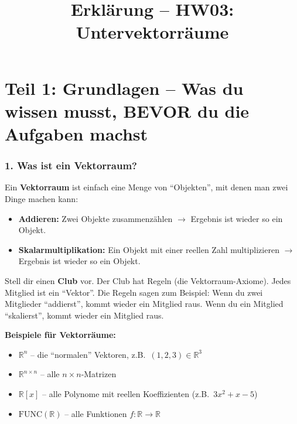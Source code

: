 \documentclass[a4paper,12pt]{article}
\title{Erkl\"arung -- HW03: Untervektorr\"aume}
\author{}
\date{}
\begin{document}
\maketitle

\part*{Teil 1: Grundlagen -- Was du wissen musst, BEVOR du die Aufgaben machst}

\section*{1. Was ist ein Vektorraum?}

Ein \textbf{Vektorraum} ist einfach eine Menge von ``Objekten'', mit denen man zwei Dinge machen kann:
\begin{itemize}
    \item \textbf{Addieren:} Zwei Objekte zusammenz\"ahlen $\rightarrow$ Ergebnis ist wieder so ein Objekt.
    \item \textbf{Skalarmultiplikation:} Ein Objekt mit einer reellen Zahl multiplizieren $\rightarrow$ Ergebnis ist wieder so ein Objekt.
\end{itemize}

\begin{analogie}
Stell dir einen \textbf{Club} vor. Der Club hat Regeln (die Vektorraum-Axiome). Jedes Mitglied ist ein ``Vektor''. Die Regeln sagen zum Beispiel: Wenn du zwei Mitglieder ``addierst'', kommt wieder ein Mitglied raus. Wenn du ein Mitglied ``skalierst'', kommt wieder ein Mitglied raus.
\end{analogie}

\textbf{Beispiele f\"ur Vektorr\"aume:}
\begin{itemize}
    \item $\mathbb{R}^n$ -- die ``normalen'' Vektoren, z.B.\ $(1, 2, 3) \in \mathbb{R}^3$
    \item $\mathbb{R}^{n \times n}$ -- alle $n \times n$-Matrizen
    \item $\mathbb{R}[x]$ -- alle Polynome mit reellen Koeffizienten (z.B.\ $3x^2 + x - 5$)
    \item $\mathrm{FUNC}(\mathbb{R})$ -- alle Funktionen $f \colon \mathbb{R} \to \mathbb{R}$
\end{itemize}
\end{document}
